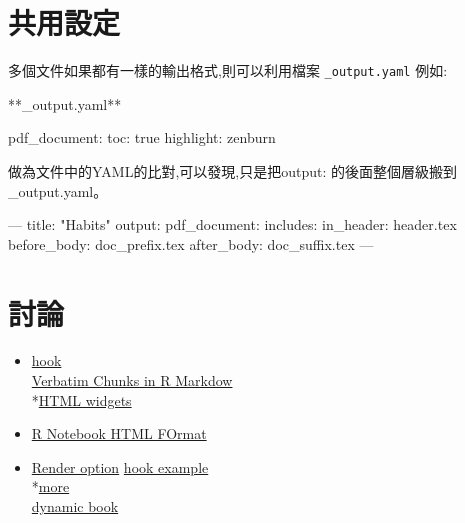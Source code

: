 \documentclass[]{book}
\newenvironment{Shaded}{\begin{snugshade}}{\end{snugshade}}
\newcommand{\AttributeTok}[1]{\textcolor[rgb]{0.77,0.63,0.00}{#1}}
\newcommand{\FunctionTok}[1]{\textcolor[rgb]{0.00,0.00,0.00}{#1}}
\newcommand{\OtherTok}[1]{\textcolor[rgb]{0.56,0.35,0.01}{#1}}
\newcommand{\StringTok}[1]{\textcolor[rgb]{0.31,0.60,0.02}{#1}}
\providecommand{\tightlist}{%
  \setlength{\itemsep}{0pt}\setlength{\parskip}{0pt}}
\theoremstyle{definition}
\theoremstyle{definition}
\theoremstyle{definition}
\theoremstyle{remark}
\begin{document}
\section{共用設定}

多個文件如果都有一樣的輸出格式,則可以利用檔案 \texttt{\_output.yaml}
例如:

**\_output.yaml**

\begin{Shaded}
\begin{Highlighting}[]
\FunctionTok{pdf_document:}
  \FunctionTok{toc:}\AttributeTok{ true}
  \FunctionTok{highlight:}\AttributeTok{ zenburn}
\end{Highlighting}
\end{Shaded}

做為文件中的YAML的比對,可以發現,只是把output:
的後面整個層級搬到\_output.yaml。

\begin{Shaded}
\begin{Highlighting}[]
\OtherTok{---}
\FunctionTok{title:}\AttributeTok{ }\StringTok{"Habits"}
\FunctionTok{output:}
  \FunctionTok{pdf_document:}
    \FunctionTok{includes:}
      \FunctionTok{in_header:}\AttributeTok{ header.tex}
      \FunctionTok{before_body:}\AttributeTok{ doc_prefix.tex}
      \FunctionTok{after_body:}\AttributeTok{ doc_suffix.tex}
\OtherTok{---}
\end{Highlighting}
\end{Shaded}

\hypertarget{-1}{%
\section{討論}\label{-1}}

\begin{itemize}
\tightlist
\item
  \href{https://github.com/lmmx/devnotes/wiki/Rmarkdown-custom-knit-hook-to-compile-a-multi-part-document}{hook}\\
  \href{https://rmarkdown.rstudio.com/articles_verbatim2.html}{Verbatim
  Chunks in R Markdow}\\
  *\href{https://github.com/rstudio/rmarkdown-book/blob/master/16-widgets.Rmd}{HTML
  widgets}\\
\item
  \href{https://rmarkdown.rstudio.com/r_notebook_format.html}{R Notebook
  HTML FOrmat}\\
\item
  \href{http://brooksandrew.github.io/simpleblog/articles/render-reports-directly-from-R-scripts/}{Render
  option}
  \href{https://selbydavid.com/2017/06/18/rmarkdown-alerts/}{hook
  example}\\
  *\href{https://gist.github.com/yihui/2629886}{more}\\
  \href{https://github.com/yihui/knitr-book}{dynamic book}
\end{itemize}
\end{document}
